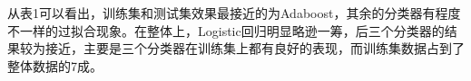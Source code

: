 从表1可以看出，训练集和测试集效果最接近的为Adaboost，其余的分类器有程度不一样的过拟合现象。在整体上，Logistic回归明显略逊一筹，后三个分类器的结果较为接近，主要是三个分类器在训练集上都有良好的表现，而训练集数据占到了整体数据的7成。
